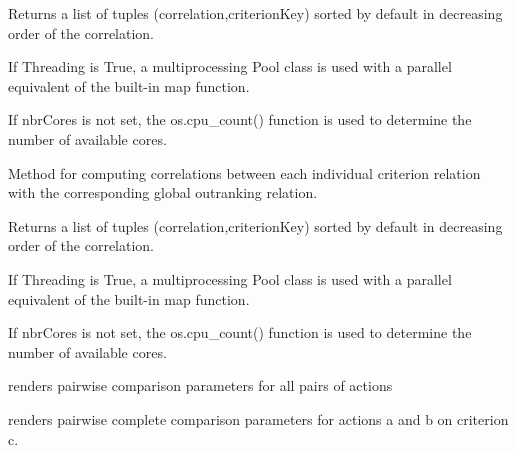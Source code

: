 \documentclass[letterpaper,10pt,english]{sphinxmanual}
\begin{document}
\begin{fulllineitems}
\begin{fulllineitems}
Returns a list of tuples (correlation,criterionKey) sorted by default in decreasing order of the correlation.

If Threading is True, a multiprocessing Pool class is used with a parallel equivalent of the built-in map function.

If nbrCores is not set, the os.cpu\_count() function is used to determine the number of
available cores.

\end{fulllineitems}


\begin{fulllineitems}
\label{techDoc:outrankingDigraphs.OutrankingDigraph.computeMarginalVersusGlobalRankingCorrelations}
Method for computing correlations between each individual criterion relation with the corresponding
global outranking relation.

Returns a list of tuples (correlation,criterionKey) sorted by default in decreasing order of the correlation.

If Threading is True, a multiprocessing Pool class is used with a parallel equivalent of the built-in map function.

If nbrCores is not set, the os.cpu\_count() function is used to determine the number of
available cores.

\end{fulllineitems}


\begin{fulllineitems}
\label{techDoc:outrankingDigraphs.OutrankingDigraph.computePairwiseComparisons}
renders pairwise comparison parameters for all pairs of actions

\end{fulllineitems}


\begin{fulllineitems}
\label{techDoc:outrankingDigraphs.OutrankingDigraph.computePairwiseCompleteComparison}
renders pairwise complete comparison parameters for actions a and b
on criterion c.


\end{fulllineitems}
\end{fulllineitems}
\end{document}

